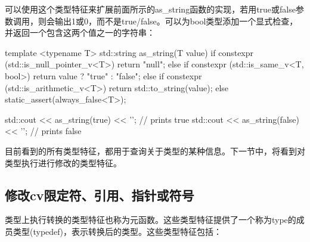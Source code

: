 可以使用这个类型特征来扩展前面所示的as\_string函数的实现，若用true或false参数调用，则会输出1或0，而不是true/false。可以为bool类型添加一个显式检查，并返回一个包含这两个值之一的字符串：

\begin{cpp}
template <typename T>
std::string as_string(T value)
{
	if constexpr (std::is_null_pointer_v<T>)
		return "null";
	else if constexpr (std::is_same_v<T, bool>)
		return value ? "true" : "false";
	else if constexpr (std::is_arithmetic_v<T>)
		return std::to_string(value);
	else
		static_assert(always_false<T>);
}

std::cout << as_string(true) << '\n'; // prints true
std::cout << as_string(false) << '\n'; // prints false
\end{cpp}

目前看到的所有类型特征，都用于查询关于类型的某种信息。下一节中，将看到对类型执行进行修改的类型特征。

\subsection{修改cv限定符、引用、指针或符号}

类型上执行转换的类型特征也称为元函数。这些类型特征提供了一个称为type的成员类型(typedef)，表示转换后的类型。这些类型特征包括：


